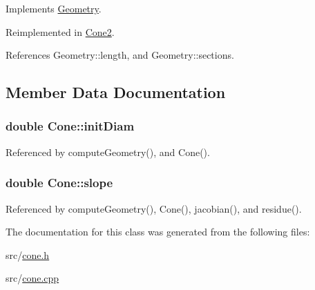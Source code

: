 Implements \hyperlink{classGeometry_aab2d4db916d7c8541af6624a82b2d4df}{Geometry}.



Reimplemented in \hyperlink{classCone2_a7aeaee918b84b78b5b00f9572bedd349}{Cone2}.



References Geometry\-::length, and Geometry\-::sections.



\subsection{Member Data Documentation}
\hypertarget{classCone_a6a9d357f81bd97a8af3fb14b3d5b3d7a}{
\subsubsection[{init\-Diam}]{\setlength{\rightskip}{0pt plus 5cm}double Cone\-::init\-Diam\hspace{0.3cm}{\ttfamily [protected]}}}\label{classCone_a6a9d357f81bd97a8af3fb14b3d5b3d7a}


Referenced by compute\-Geometry(), and Cone().

\hypertarget{classCone_ab0de5b540524262d297001275d5e6d32}{
\subsubsection[{slope}]{\setlength{\rightskip}{0pt plus 5cm}double Cone\-::slope\hspace{0.3cm}{\ttfamily [protected]}}}\label{classCone_ab0de5b540524262d297001275d5e6d32}


Referenced by compute\-Geometry(), Cone(), jacobian(), and residue().



The documentation for this class was generated from the following files\-:\begin{DoxyCompactItemize}
\item 
src/\hyperlink{cone_8h}{cone.\-h}\item 
src/\hyperlink{cone_8cpp}{cone.\-cpp}\end{DoxyCompactItemize}
